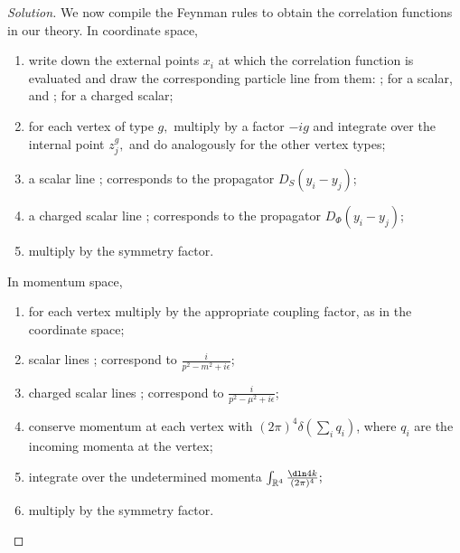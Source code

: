 \begin{proof}[Solution]
   We now compile the Feynman rules to obtain the correlation functions in our theory. In coordinate space, 
   \begin{enumerate}[label=(\alph*)]
      \item write down the external points \(x_i\) at which the correlation function is evaluated and draw the corresponding particle line from them:  ; for a scalar, and ; for a charged scalar;
      \item for each vertex of type \(g,\) multiply by a factor \(-ig\) and integrate over the internal point \(z_j^g,\) and do analogously for the other vertex types;
      \item a scalar line ; corresponds to the propagator \(D_S(y_i - y_j)\);
      \item a charged scalar line ; corresponds to the propagator \(D_\Phi(y_i - y_j)\);
      \item multiply by the symmetry factor.
   \end{enumerate}
   In momentum space, 
   \begin{enumerate}[label=(\alph*)]
       \item for each vertex multiply by the appropriate coupling factor, as in the coordinate space;
       \item scalar lines ; correspond to \(\frac{i}{p^2 - m^2 + i \epsilon}\);
       \item charged scalar lines ; correspond to \(\frac{i}{p^2 - \mu^2 + i \epsilon}\);
       \item conserve momentum at each vertex with \((2\pi)^4\delta(\sum_i q_i)\), where \(q_i\) are the incoming momenta at the vertex;
       \item integrate over the undetermined momenta \(\int_{\mathbb{R}^4}\frac{\dln4k}{(2\pi)^4};\)
       \item multiply by the symmetry factor.
   \end{enumerate}
\end{proof}
